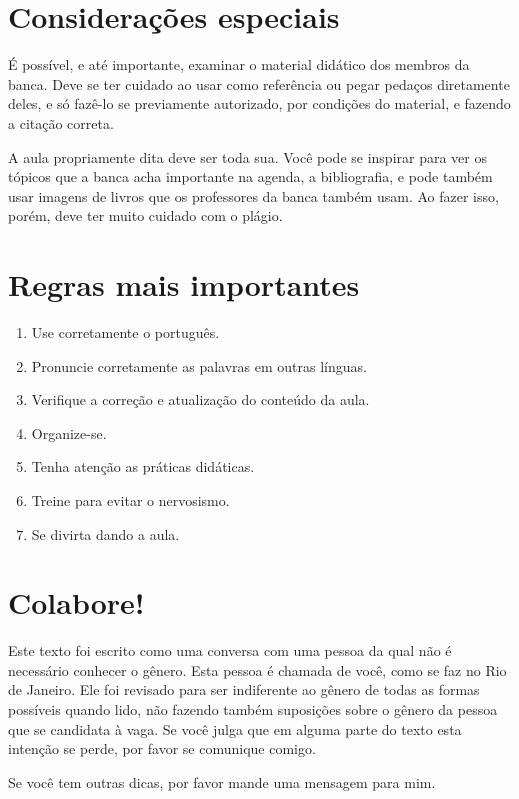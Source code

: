 \documentclass{article}
\begin{document}
\section{Considerações especiais}

É possível, e até importante,  examinar o material didático dos membros da banca. Deve se ter cuidado ao usar como referência ou pegar pedaços diretamente deles, e só fazê-lo se previamente autorizado, por condições do material, e fazendo a citação correta. 

A aula propriamente dita deve ser toda sua. Você pode se inspirar para ver os tópicos que a banca acha importante na agenda, a bibliografia, e pode também usar imagens de livros que os professores da banca também usam. Ao fazer isso, porém, deve ter muito cuidado com o plágio.

\section{Regras mais importantes}

\begin{enumerate}
\item Use corretamente o português.
\item Pronuncie corretamente as palavras em outras línguas.
\item Verifique a correção e atualização do conteúdo da aula.
\item Organize-se.
\item Tenha atenção as práticas didáticas.
\item Treine para evitar o nervosismo.
\item Se divirta dando a aula.
\end{enumerate}

\section{Colabore!}

Este texto foi escrito como uma conversa com uma pessoa da qual não é necessário conhecer o gênero. Esta pessoa é chamada de você, como se faz no Rio de Janeiro. Ele foi revisado para ser indiferente ao gênero de todas as formas possíveis quando lido, não fazendo também suposições sobre o gênero da pessoa que se candidata à vaga. Se você julga que em alguma parte do texto esta intenção se perde, por favor se comunique comigo.

Se você tem outras dicas, por favor mande uma mensagem para mim.
\end{document}
